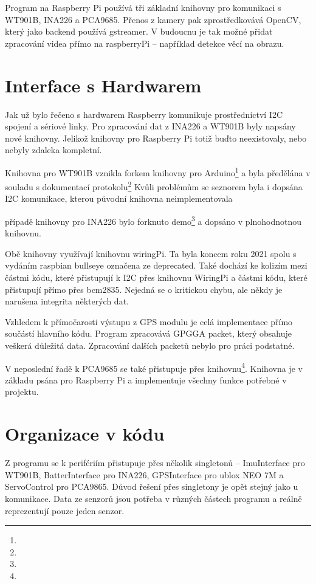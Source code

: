\documentclass[a4paper,oneside,12pt]{report}
\begin{document}
Program na Raspberry Pi používá tři základní knihovny pro komunikaci s WT901B, INA226 a PCA9685.
Přenos z kamery pak zprostředkovává OpenCV, který jako backend používá gstreamer.
V budoucnu je tak možné přidat zpracování videa přímo na raspberryPi -- například detekce věcí na obrazu.

\section{Interface s Hardwarem}

Jak už bylo řečeno s hardwarem Raspberry komunikuje prostřednictví I2C spojení a sériové linky.
Pro zpracování dat z INA226 a WT901B byly napsány nové knihovny.
Jelikož knihovny pro Raspberry Pi totiž buďto neexistovaly, nebo nebyly zdaleka kompletní.

Knihovna pro WT901B vznikla forkem knihovny pro Arduino\footnote{} a byla předělána v souladu s dokumentací protokolu\footnote{}
Kvůli problémům se seznorem byla i dopsána I2C komunikace, kterou původní knihovna neimplementovala

 případě knihovny pro INA226 bylo forknuto demo\footnote{} a dopsáno v plnohodnotnou knihovnu.

Obě knihovny využívají knihovnu wiringPi.
Ta byla koncem roku 2021 spolu s vydáním raspbian bullseye označena ze deprecated.
Také dochází ke kolizím mezi částmi kódu, které přistupují k I2C přes knihovnu WiringPi a částmi kódu, které přistupují přímo přes bcm2835.
Nejedná se o kritickou chybu, ale někdy je narušena integrita některých dat.

Vzhledem k přímočarosti výstupu z GPS modulu je celá implementace přímo součástí hlavního kódu.
Program zpracovává GPGGA packet, který obsahuje veškerá důležitá data.
Zpracování dalších packetů nebylo pro práci podstatné.

V neposlední řadě k PCA9685 se také přistupuje přes knihovnu\footnote{}.
Knihovna je v základu psána pro Raspberry Pi a implementuje všechny funkce potřebné v projektu.

\section{Organizace v kódu}

Z programu se k perifériím přistupuje přes několik singletonů -- ImuInterface pro WT901B, BatterInterface pro INA226, GPSInterface pro ublox NEO 7M a ServoControl pro PCA9865.
Důvod řešení přes singletony je opět stejný jako u komunikace.
Data ze senzorů jsou potřeba v různých částech programu a reálně reprezentují pouze jeden senzor.
\end{document}
